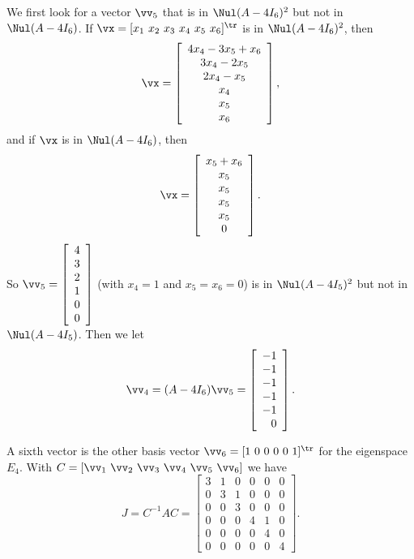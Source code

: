 \item We first look for a vector $\vv_5$ that is in $\Nul (A-4I_6)^2$ but not in $\Nul (A-4I_6)$. If $\vx = [x_1 \ x_2 \ x_3 \ x_4 \ x_5 \ x_6]^{\tr}$ is in $\Nul (A-4I_6)^2$, then 
\[\vx = \left[ \begin{array}{c} 4x_4-3x_5+x_6 \\ 3x_4-2x_5 \\ 2x_4-x_5 \\ x_4 \\ x_5 \\ x_6 \end{array} \right],\]
and if $\vx$ is in $\Nul (A-4I_6)$, then 
\[\vx = \left[ \begin{array}{c} x_5+x_6 \\ x_5 \\ x_5 \\ x_5 \\ x_5 \\ 0 \end{array} \right].\]
So $\vv_5 = \left[ \begin{array}{c} 4 \\ 3 \\ 2 \\ 1 \\ 0 \\ 0 \end{array} \right]$ (with $x_4=1$ and $x_5=x_6=0$) is in $\Nul (A-4I_5)^2$ but not in $\Nul (A-4I_5)$. Then we let 
\[\vv_4 = (A-4I_6)\vv_5 = \left[ \begin{array}{r} -1 \\ -1 \\ -1 \\ -1 \\ -1 \\ 0 \end{array} \right].\]

\item A sixth vector is the other basis vector $\vv_6 = [1 \ 0 \ 0 \ 0 \ 0 \ 1]^{\tr}$ for the eigenspace $E_4$. With $C = [\vv_1 \ \vv_2 \ \vv_3 \ \vv_4 \ \vv_5 \ \vv_6]$ we have 
\[J=C^{-1}AC = \left[ \begin{array}{cccccc} 3&1&0&0&0&0 \\ 0&3&1&0&0&0 \\ 0&0&3&0&0&0 \\ 0&0&0&4&1&0 \\ 0&0&0&0&4&0 \\ 0&0&0&0&0&4 \end{array} \right].\]

